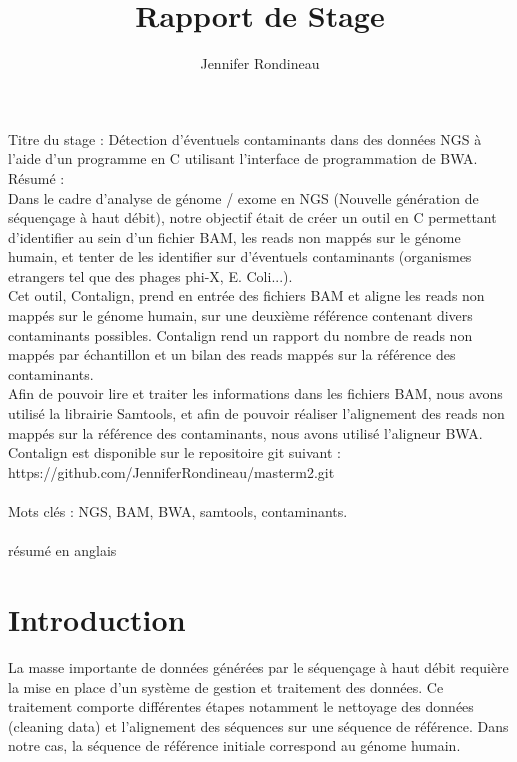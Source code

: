 \documentclass[a4paper,12pt]{article}
\title{Rapport de Stage}
\author{Jennifer Rondineau}
\begin{document}
 

Titre du stage : Détection d'éventuels contaminants dans des données NGS à l'aide d'un programme en C utilisant l'interface de programmation de BWA. \\

Résumé : \\
Dans le cadre d'analyse de génome / exome en NGS (Nouvelle génération de séquençage à haut débit), notre objectif était de créer un outil en C permettant d'identifier au sein d'un fichier BAM, les reads non mappés sur le génome humain, et tenter de les identifier sur d'éventuels contaminants (organismes etrangers tel que des phages phi-X, E. Coli...). \\
Cet outil, Contalign, prend en entrée des fichiers BAM et aligne les reads non mappés sur le génome humain, sur une deuxième référence contenant divers contaminants possibles. Contalign rend un rapport du nombre de reads non mappés par échantillon et un bilan des reads mappés sur la référence des contaminants. \\
Afin de pouvoir lire et traiter les informations dans les fichiers BAM, nous avons utilisé la librairie Samtools, et afin de pouvoir réaliser l'alignement des reads non mappés sur la référence des contaminants, nous avons utilisé l'aligneur BWA. Contalign est disponible sur le repositoire git suivant : https://github.com/JenniferRondineau/masterm2.git \\\\

Mots clés : NGS, BAM, BWA, samtools, contaminants. \\
\clearpage
\paragraph{}
résumé en anglais 

\clearpage %
\renewcommand{\contentsname}{Sommaire} 
\tableofcontents{} %
\clearpage

\section{Introduction}

La masse importante de données générées par le séquençage à haut débit requière la mise en place d'un système de gestion et traitement des données. Ce traitement comporte différentes étapes notamment le nettoyage des données (cleaning data) et l'alignement des séquences sur une séquence de référence. Dans notre cas, la séquence de référence initiale correspond au génome humain.
\end{document}
